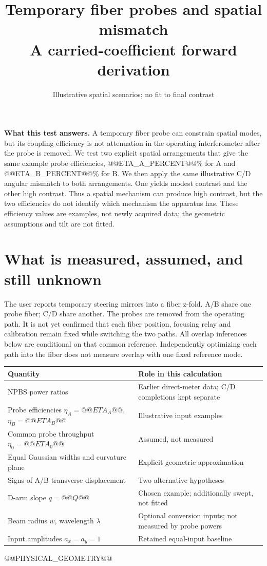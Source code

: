 \documentclass[11pt,a4paper]{article}
\title{Temporary fiber probes and spatial mismatch\\A carried-coefficient forward derivation}
\author{Illustrative spatial scenarios; no fit to final contrast}
\date{}
\begin{document}
\maketitle

\noindent\textbf{What this test answers.} A temporary fiber probe can constrain
spatial modes, but its coupling efficiency is not attenuation in the operating
interferometer after the probe is removed. We test two explicit spatial
arrangements that give the same example probe efficiencies, @@ETA_A_PERCENT@@\% for A and
@@ETA_B_PERCENT@@\% for B. We then apply the same illustrative C/D angular mismatch to both
arrangements. One yields modest contrast and the other high contrast. Thus a
spatial mechanism can produce high contrast, but the two efficiencies do not
identify which mechanism the apparatus has. These efficiency values are examples, not
newly acquired data; the geometric assumptions and tilt are not fitted.

\section{What is measured, assumed, and still unknown}
The user reports temporary steering mirrors into a fiber z-fold. A/B share one
probe fiber; C/D share another. The probes are removed from the operating path.
It is not yet confirmed that each fiber position, focusing relay and calibration
remain fixed while switching the two paths. All overlap inferences below are
conditional on that common reference. Independently optimizing each path into
the fiber does not measure overlap with one fixed reference mode.

\begin{center}\small\begin{tabular}{>{\raggedright\arraybackslash}p{.43\linewidth}>{\raggedright\arraybackslash}p{.50\linewidth}}\toprule
Quantity & Role in this calculation \\\midrule
NPBS power ratios & Earlier direct-meter data; C/D completions kept separate \\
Probe efficiencies $\eta_A=@@ETA_A@@$, $\eta_B=@@ETA_B@@$ & Illustrative input examples \\
Common probe throughput $\eta_0=@@ETA_0@@$ & Assumed, not measured \\
Equal Gaussian widths and curvature plane & Explicit geometric approximation \\
Signs of A/B transverse displacement & Two alternative hypotheses \\
D-arm slope $q=@@Q@@$ & Chosen example; additionally swept, not fitted \\
Beam radius $w$, wavelength $\lambda$ & Optional conversion inputs; not measured by probe powers \\
Input amplitudes $a_x=a_y=1$ & Retained equal-input baseline \\
\bottomrule\end{tabular}\end{center}
@@PHYSICAL_GEOMETRY@@
\end{document}
